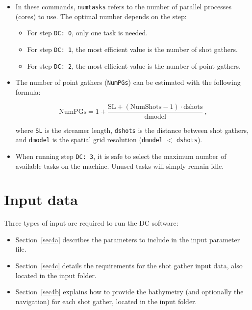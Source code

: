 \documentclass[11pt, oneside]{article}   	%
\begin{document}
\begin{itemize}
    \item In these commands, \texttt{numtasks} refers to the number of parallel processes (cores) to use. The optimal number depends on the step:
    \begin{itemize}
        \item For step \texttt{DC: 0}, only one task is needed.
        \item For step \texttt{DC: 1}, the most efficient value is the number of shot gathers.
        \item For step \texttt{DC: 2}, the most efficient value is the number of point gathers.
    \end{itemize}

    \item The number of point gathers (\texttt{NumPGs}) can be estimated with the following formula:
    
    \begin{equation}
    \text{NumPGs} = 1 + \frac{\text{SL} + (\text{NumShots} - 1) \cdot \text{dshots}}{\text{dmodel}} ~,
    \end{equation}
    
    where \texttt{SL} is the streamer length, \texttt{dshots} is the distance between shot gathers, and \texttt{dmodel} is the spatial grid resolution (\texttt{dmodel} $<$ \texttt{dshots}).
    
    \item When running step \texttt{DC: 3}, it is safe to select the maximum number of available tasks on the machine. Unused tasks will simply remain idle.
\end{itemize}


\section{Input data}\label{sec4}

Three types of input are required to run the DC software:

\begin{itemize}
\item Section~\ref{sec4a} describes the parameters to include in the input parameter file.
\item Section~\ref{sec4c} details the requirements for the shot gather input data, also located in the input folder.
\item Section~\ref{sec4b} explains how to provide the bathymetry (and optionally the navigation) for each shot gather, located in the input folder.
\end{itemize}
\end{document}
